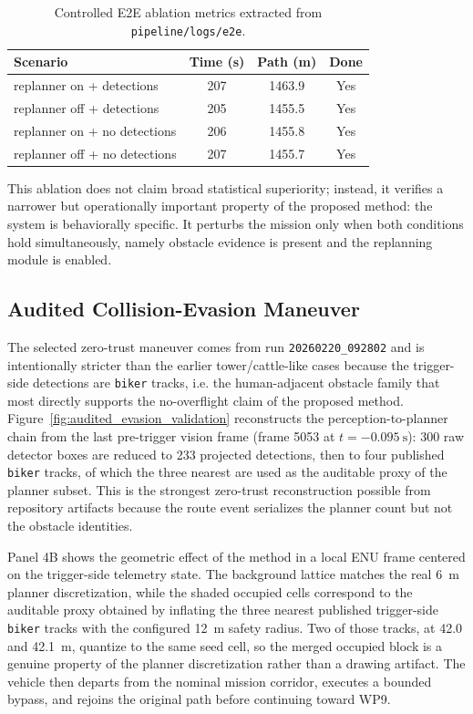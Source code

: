 \documentclass[journal,twoside,web]{ieeecolor}
\begin{document}
\begin{table}[t]
    \centering
    \small
    \begin{tabular}{@{}p{} S[table-format=3.0] S[table-format=4.1] c@{}}
        \toprule
        \textbf{Scenario} & {\textbf{Time (s)}} & {\textbf{Path (m)}} & \textbf{Done} \\
        \midrule
        replanner on + detections & 207 & 1463.9 & Yes \\
        replanner off + detections & 205 & 1455.5 & Yes \\
        replanner on + no detections & 206 & 1455.8 & Yes \\
        replanner off + no detections & 207 & 1455.7 & Yes \\
        \bottomrule
    \end{tabular}
    \caption{Controlled E2E ablation metrics extracted from \texttt{pipeline/logs/e2e}.}
    \label{tab:e2e}
\end{table}

This ablation does not claim broad statistical superiority; instead, it verifies a narrower but operationally important property of the proposed method: the system is behaviorally specific. It perturbs the mission only when both conditions hold simultaneously, namely obstacle evidence is present and the replanning module is enabled.

\subsection{Audited Collision-Evasion Maneuver}

The selected zero-trust maneuver comes from run \texttt{20260220\_092802} and is intentionally stricter than the earlier tower/cattle-like cases because the trigger-side detections are \texttt{biker} tracks, i.e. the human-adjacent obstacle family that most directly supports the no-overflight claim of the proposed method. Figure~\ref{fig:audited_evasion_validation} reconstructs the perception-to-planner chain from the last pre-trigger vision frame (frame 5053 at \(t=-\SI{0.095}{\second}\)): 300 raw detector boxes are reduced to 233 projected detections, then to four published \texttt{biker} tracks, of which the three nearest are used as the auditable proxy of the planner subset. This is the strongest zero-trust reconstruction possible from repository artifacts because the route event serializes the planner count but not the obstacle identities.


Panel 4B shows the geometric effect of the method in a local ENU frame centered on the trigger-side telemetry state. The background lattice matches the real \SI{6}{\meter} planner discretization, while the shaded occupied cells correspond to the auditable proxy obtained by inflating the three nearest published trigger-side \texttt{biker} tracks with the configured \SI{12}{\meter} safety radius. Two of those tracks, at 42.0 and \SI{42.1}{\meter}, quantize to the same seed cell, so the merged occupied block is a genuine property of the planner discretization rather than a drawing artifact. The vehicle then departs from the nominal mission corridor, executes a bounded bypass, and rejoins the original path before continuing toward WP9.
\end{document}
